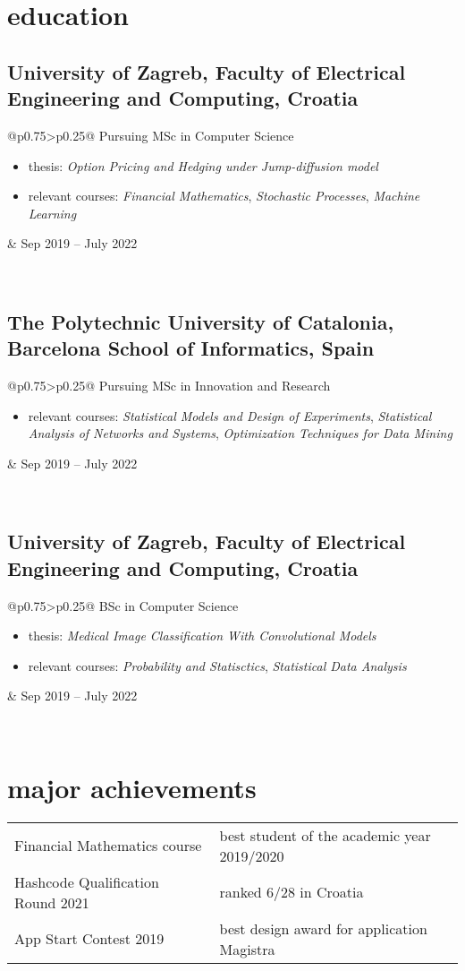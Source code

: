 \documentclass[a4paper]{article}
\makeatletter
\newlength{\tablewidth}
\newenvironment{period}[2]{%
\newcommand{\sarma}{#2}%
\setlength{\tablewidth}{\linewidth}
\addtolength{\tablewidth}{-2\tabcolsep}
\begin{tabular}{@{}p{0.75\tablewidth}>{\raggedleft\arraybackslash}p{0.25\tablewidth}@{}}%
#1 \newline
\begin{itemize}
}{%
\end{itemize} & \sarma \\%
\end{tabular}\\
}
\newenvironment{skills}{%
\setlength{\tablewidth}{\linewidth}
\addtolength{\tablewidth}{-2\tabcolsep}
\begin{tabular}{@{}p{0.22\tablewidth}p{0.78\tablewidth}@{}}
}{%
\end{tabular}
}
\makeatother
\begin{document}
\section{education}
\subsection{University of Zagreb, Faculty of Electrical Engineering and Computing, Croatia}
\begin{period}{Pursuing MSc in Computer Science}{Sep 2019 -- July 2022}
    \item thesis:
        \textit{Option Pricing and Hedging under Jump-diffusion model}
    \item relevant courses:
        \textit{Financial Mathematics},
        \textit{Stochastic Processes},
        \textit{Machine Learning}
\end{period}
\subsection{The Polytechnic University of Catalonia, Barcelona School of Informatics, Spain}
\begin{period}{Pursuing MSc in Innovation and Research}{Sep 2020 -- Jan 2021}
    \item relevant courses:
        \textit{Statistical Models and Design of Experiments},
        \textit{Statistical Analysis of Networks and Systems},
        \textit{Optimization Techniques for Data Mining}
\end{period}
\subsection{University of Zagreb, Faculty of Electrical Engineering and Computing, Croatia}
\begin{period}{BSc in Computer Science}{Sep 2016 -- Jul 2019}
    \item thesis:
        \textit{Medical Image Classification With Convolutional Models}
    \item relevant courses:
        \textit{Probability and Statisctics},
        \textit{Statistical Data Analysis}
\end{period}

\section{major achievements}
\begin{skills}
    Financial Mathematics course & best student of the academic year 2019/2020\\
    Hashcode Qualification Round 2021 & ranked 6/28 in Croatia\\
    App Start Contest 2019 & best design award for application Magistra
\end{skills}
\end{document}
